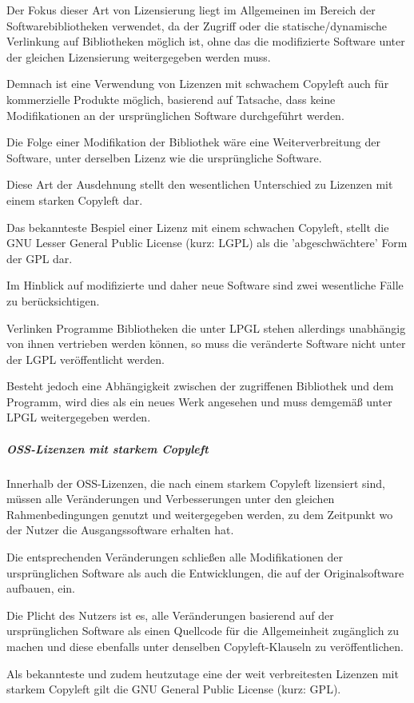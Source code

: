 Der Fokus dieser Art von Lizensierung liegt im Allgemeinen im Bereich der Softwarebibliotheken verwendet, da der Zugriff oder die statische/dynamische Verlinkung auf Bibliotheken möglich ist, ohne das die modifizierte Software unter der gleichen Lizensierung weitergegeben werden muss. 

Demnach ist eine Verwendung von Lizenzen mit schwachem Copyleft auch für kommerzielle Produkte möglich, basierend auf Tatsache, dass keine Modifikationen an der ursprünglichen Software durchgeführt werden. 

Die Folge einer Modifikation der Bibliothek wäre eine Weiterverbreitung der Software, unter derselben Lizenz wie die ursprüngliche Software. 

Diese Art der Ausdehnung stellt den wesentlichen Unterschied zu Lizenzen mit einem starken Copyleft dar. 

Das bekannteste Bespiel einer Lizenz mit einem schwachen Copyleft, stellt die GNU Lesser General Public License (kurz: LGPL) als die 'abgeschwächtere' Form der GPL dar. 

Im Hinblick auf modifizierte und daher neue Software sind zwei wesentliche Fälle zu berücksichtigen. 

Verlinken Programme Bibliotheken die unter LPGL stehen allerdings unabhängig von ihnen vertrieben werden können, so muss die veränderte Software nicht unter der LGPL veröffentlicht werden. 

Besteht jedoch eine Abhängigkeit zwischen der zugriffenen Bibliothek und dem Programm, wird dies als ein neues Werk angesehen und muss demgemäß unter LPGL weitergegeben werden. 

\subparagraph{OSS-Lizenzen mit starkem Copyleft}
Innerhalb der OSS-Lizenzen, die nach einem starkem Copyleft lizensiert sind, müssen alle Veränderungen und Verbesserungen unter den gleichen Rahmenbedingungen genutzt und weitergegeben werden, zu dem Zeitpunkt wo der Nutzer die Ausgangssoftware erhalten hat. 

Die entsprechenden Veränderungen schließen alle Modifikationen der ursprünglichen Software als auch die Entwicklungen, die auf der Originalsoftware aufbauen, ein. 

Die Plicht des Nutzers ist es, alle Veränderungen basierend auf der ursprünglichen Software als einen Quellcode für die Allgemeinheit zugänglich zu machen und diese ebenfalls unter denselben Copyleft-Klauseln zu veröffentlichen. 

Als bekannteste und zudem heutzutage eine der weit verbreitesten Lizenzen mit starkem Copyleft gilt die GNU General Public License (kurz: GPL). 

